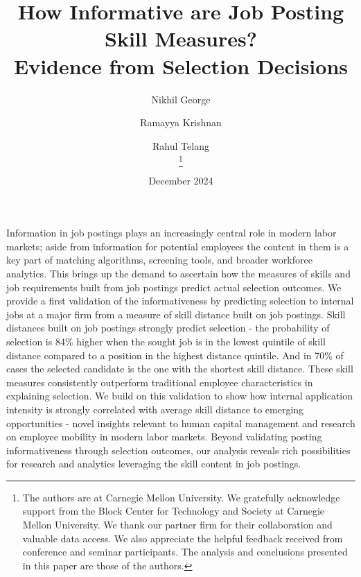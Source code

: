 \documentclass[letterpaper,11pt,leqno]{article}
\begin{document}

\title{How Informative are Job Posting Skill Measures? \\ Evidence from Selection Decisions}

\author{Nikhil George \and Ramayya Krishnan \and Rahul Telang \\

\thanks{The authors are at Carnegie Mellon University. We gratefully acknowledge support from the Block Center for Technology and Society at Carnegie Mellon University. We thank our partner firm for their collaboration and valuable data access. We also appreciate the helpful feedback received from conference and seminar participants. The analysis and conclusions presented in this paper are those of the authors.}}

\date{December 2024}

\begin{titlepage}

\maketitle

Information in job postings plays an increasingly central role in modern labor markets; aside from information for potential employees the content in them is a key part of matching algorithms, screening tools, and broader workforce analytics. This brings up the demand to ascertain how the measures of skills and job requirements built from job postings predict actual selection outcomes. We provide a first validation of the informativeness by predicting selection to internal jobs at a major firm from a measure of skill distance built on job postings. Skill distances built on job postings strongly predict selection - the probability of selection is 84\% higher when the sought job is in the lowest quintile of skill distance compared to a position in the highest distance quintile. And in 70\% of cases the selected candidate is the one with the shortest skill distance. These skill measures consistently outperform traditional employee characteristics in explaining selection. We build on this validation to show how internal application intensity is strongly correlated with average skill distance to emerging opportunities - novel insights relevant to human capital management and research on employee mobility in modern labor markets. Beyond validating posting informativeness through selection outcomes, our analysis reveals rich possibilities for research and analytics leveraging the skill content in job postings.

\end{titlepage}
\end{document}
